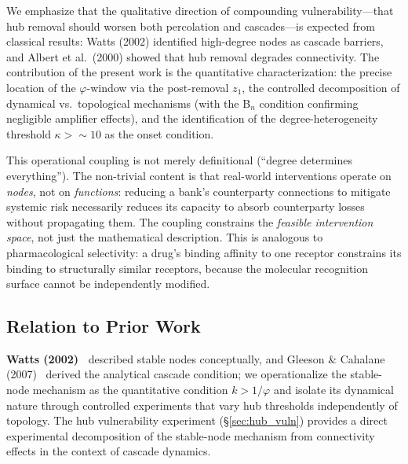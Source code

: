 \documentclass[aps,pre,twocolumn,superscriptaddress,showpacs]{revtex4-2}
\begin{document}
We emphasize that the qualitative direction of compounding vulnerability---that hub removal should worsen both percolation and cascades---is expected from classical results: Watts (2002) identified high-degree nodes as cascade barriers, and Albert et al.\ (2000) showed that hub removal degrades connectivity. The contribution of the present work is the quantitative characterization: the precise location of the $\varphi$-window via the post-removal $z_1$, the controlled decomposition of dynamical vs.\ topological mechanisms (with the B$_n$ condition confirming negligible amplifier effects), and the identification of the degree-heterogeneity threshold $\kappa > {\sim}10$ as the onset condition.

This operational coupling is not merely definitional (``degree determines everything''). The non-trivial content is that real-world interventions operate on \emph{nodes}, not on \emph{functions}: reducing a bank's counterparty connections to mitigate systemic risk necessarily reduces its capacity to absorb counterparty losses without propagating them. The coupling constrains the \emph{feasible intervention space}, not just the mathematical description. This is analogous to pharmacological selectivity: a drug's binding affinity to one receptor constrains its binding to structurally similar receptors, because the molecular recognition surface cannot be independently modified.

\subsection{Relation to Prior Work}

\textbf{Watts (2002)~\cite{Watts2002}} described stable nodes conceptually, and Gleeson \& Cahalane (2007)~\cite{Gleeson2007} derived the analytical cascade condition; we operationalize the stable-node mechanism as the quantitative condition $k > 1/\varphi$ and isolate its dynamical nature through controlled experiments that vary hub thresholds independently of topology. The hub vulnerability experiment (\S\ref{sec:hub_vuln}) provides a direct experimental decomposition of the stable-node mechanism from connectivity effects in the context of cascade dynamics.
\end{document}

